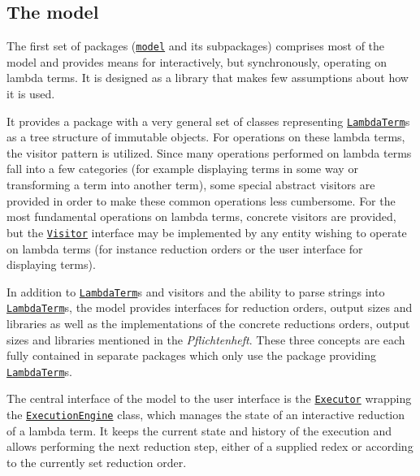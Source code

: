 \documentclass[a4paper, parskip=half]{scrartcl}
\newcommand{\pkglnk}[1]{\hyperref[pkg:edu.kit.wavelength.client.#1]{#1}}
\begin{document}
\subsection{The model}

The first set of packages (\texttt{\pkglnk{model}} and its subpackages) comprises most of the model 
and provides means for interactively, but
synchronously, operating on lambda terms. It is designed as a library that makes few
assumptions about how it is used.

It provides a package with a very general set of classes representing
\texttt{\hyperref[type:edu.kit.wavelength.client.model.term.LambdaTerm]{LambdaTerm}}s as a 
tree structure of immutable objects. For operations on these
lambda terms, the visitor pattern is utilized. Since many operations performed on 
lambda terms fall into a few categories (for example displaying terms in some way or transforming a 
term into another term), some special abstract visitors are provided in order to make these common
operations less cumbersome. For the most fundamental operations on 
lambda terms, concrete visitors are provided, but the 
\texttt{\hyperref[type:edu.kit.wavelength.client.model.term.Visitor]{Visitor}} interface may be 
implemented by any entity wishing to operate on lambda terms (for instance reduction orders or the 
user interface for displaying
terms).

In addition to \texttt{\hyperref[type:edu.kit.wavelength.client.model.term.LambdaTerm]{LambdaTerm}}s 
and visitors and the ability to parse strings into
\texttt{\hyperref[type:edu.kit.wavelength.client.model.term.LambdaTerm]{LambdaTerm}}s, the model 
provides interfaces for reduction orders,
output sizes and libraries as well as the implementations of the concrete reductions orders,
output sizes and libraries mentioned in the \textit{Pflichtenheft}. These three
concepts are each fully contained in separate packages which only use the package
providing \texttt{\hyperref[type:edu.kit.wavelength.client.model.term.LambdaTerm]{LambdaTerm}}s.

The central interface of the model to the user interface is the 
\texttt{\hyperref[type:edu.kit.wavelength.client.view.execution.Executor]{Executor}} wrapping the
\texttt{\hyperref[type:edu.kit.wavelength.client.model.ExecutionEngine]{ExecutionEngine}}
class, which manages the state of an interactive reduction of a lambda term. It
keeps the current state and history of the execution and allows performing the next
reduction step, either of a supplied redex or according to the currently set reduction
order.
\end{document}
